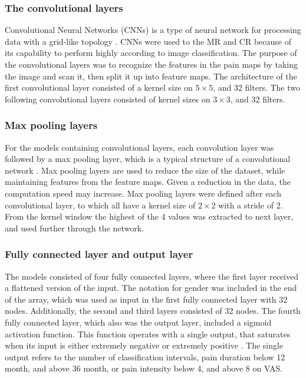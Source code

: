 \subsubsection{The convolutional layers}
Convolutional Neural Networks (CNNs) is a type of neural network for processing data with a grid-like topology \citep{Goodfellow2016}. CNNs were used to the MR and CR because of its capability to perform highly according to image classification. The purpose of the convolutional layers was to recognize the features in the pain maps by taking the image and scan it, then split it up into feature maps.\citep{Goodfellow2016,LeCun1998} The architecture of the first convolutional layer consisted of a kernel size on $5 \times 5$, and 32 filters. The two following convolutional layers consisted of kernel sizes on $3 \times 3$, and 32 filters. 

\subsubsection{Max pooling layers}
For the models containing convolutional layers, each convolution layer was followed by a max pooling layer, which is a typical structure of a convolutional network \citep{Goodfellow2016, LeCun2015}.
Max pooling layers are used to reduce the size of the dataset, while maintaining features from the feature maps. Given a reduction in the data, the computation speed may increase.\citep{Goodfellow2016,LeCun1998} 
Max pooling layers were defined after each convolutional layer, to which all have a kernel size of $2 \times 2$ with a stride of 2. From the kernel window the highest of the 4 values was extracted to next layer, and used further through the network. 

\subsubsection{Fully connected layer and output layer}
The models consisted of four fully connected layers, where the first layer received a flattened version of the input. The notation for gender was included in the end of the array, which was used as input in the first fully connected layer with 32 nodes. Additionally, the second and third layers consisted of 32 nodes. The fourth fully connected layer, which also was the output layer, included a sigmoid activation function. 
This function operates with a single output, that saturates when its input is either extremely negative or extremely positive \citep{Goodfellow2016}. The single output refers to the number of classification intervals, pain duration below 12 month, and above 36 month, or pain intensity below 4, and above 8 on VAS. 

